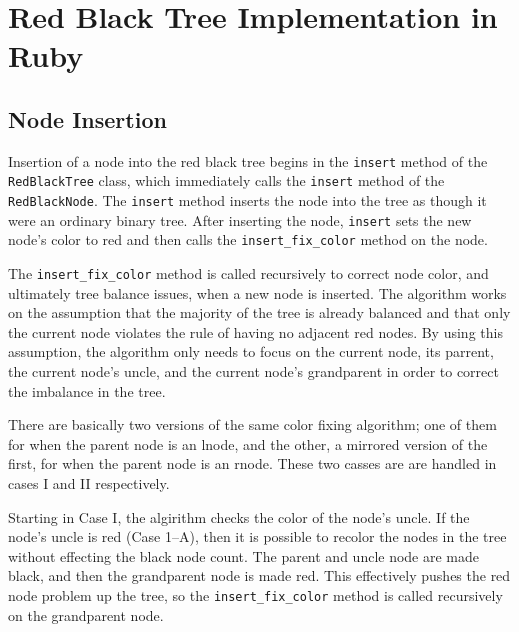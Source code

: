 \documentclass[12pt, letterpaper]{article}
\begin{document}
\section{Red Black Tree Implementation in Ruby}
\subsection{Node Insertion}
Insertion of a node into the red black tree begins in the \texttt{insert} method of the \texttt{RedBlackTree} class, which immediately calls the \texttt{insert} method of the \texttt{RedBlackNode}. The \texttt{insert} method inserts the node into the tree as though it were an ordinary binary tree. After inserting the node, \texttt{insert} sets the new node's color to red and then calls the \texttt{insert\_fix\_color} method on the node.

The \texttt{insert\_fix\_color} method is called recursively to correct node color, and ultimately tree balance issues, when a new node is inserted. The algorithm works on the assumption that the majority of the tree is already balanced and that only the current node violates the rule of having no adjacent red nodes. By using this assumption, the algorithm only needs to focus on the current node, its parrent, the current node's uncle, and the current node's grandparent in order to correct the imbalance in the tree.

There are basically two versions of the same color fixing algorithm; one of them for when the parent node is an lnode, and the other, a mirrored version of the first, for when the parent node is an rnode. These two casses are are handled in cases I and II respectively.

Starting in Case I, the algirithm checks the color of the node's uncle. If the node's uncle is red (Case 1--A), then it is possible to recolor the nodes in the tree without effecting the black node count. The parent and uncle node are made black, and then the grandparent node is made red. This effectively pushes the red node problem up the tree, so the \texttt{insert\_fix\_color} method is called recursively on the grandparent node.
\end{document}
